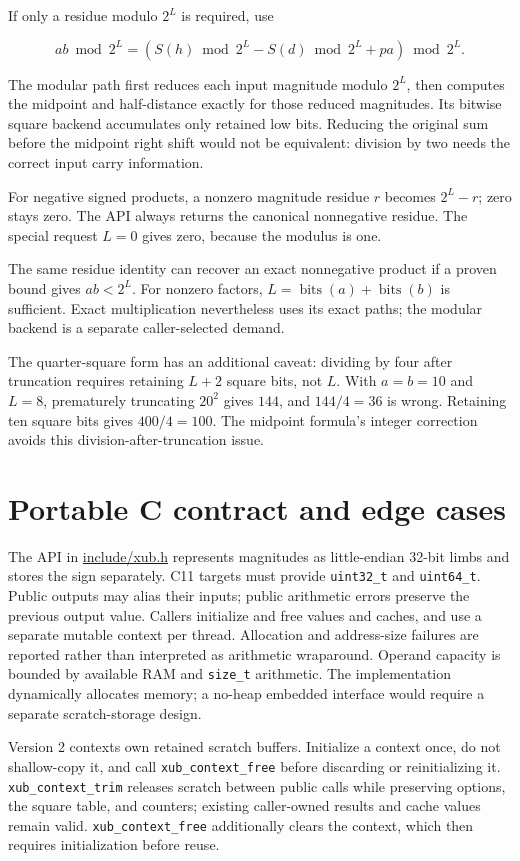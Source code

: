 \documentclass[11pt,a4paper]{article}
\begin{document}
If only a residue modulo $2^L$ is required, use

\[
ab\bmod2^L=(S(h)\bmod2^L-S(d)\bmod2^L+pa)\bmod2^L.
\]

The modular path first reduces each input magnitude modulo $2^L$, then computes the midpoint and half-distance exactly for those reduced magnitudes. Its bitwise square backend accumulates only retained low bits. Reducing the original sum before the midpoint right shift would not be equivalent: division by two needs the correct input carry information.

For negative signed products, a nonzero magnitude residue $r$ becomes $2^L-r$; zero stays zero. The API always returns the canonical nonnegative residue. The special request $L=0$ gives zero, because the modulus is one.

The same residue identity can recover an exact nonnegative product if a proven bound gives $ab<2^L$. For nonzero factors, $L=\operatorname{bits}(a)+\operatorname{bits}(b)$ is sufficient. Exact multiplication nevertheless uses its exact paths; the modular backend is a separate caller-selected demand.

The quarter-square form has an additional caveat: dividing by four after truncation requires retaining $L+2$ square bits, not $L$. With $a=b=10$ and $L=8$, prematurely truncating $20^2$ gives $144$, and $144/4=36$ is wrong. Retaining ten square bits gives $400/4=100$. The midpoint formula's integer correction avoids this division-after-truncation issue.

\section{Portable C contract and edge cases}

The API in \href{\detokenize{include/xub.h}}{include/xub.h} represents magnitudes as little-endian 32-bit limbs and stores the sign separately. C11 targets must provide \texttt{uint32\_t} and \texttt{uint64\_t}. Public outputs may alias their inputs; public arithmetic errors preserve the previous output value. Callers initialize and free values and caches, and use a separate mutable context per thread. Allocation and address-size failures are reported rather than interpreted as arithmetic wraparound. Operand capacity is bounded by available RAM and \texttt{size\_t} arithmetic. The implementation dynamically allocates memory; a no-heap embedded interface would require a separate scratch-storage design.

Version 2 contexts own retained scratch buffers. Initialize a context once, do not shallow-copy it, and call \texttt{xub\_context\_free} before discarding or reinitializing it. \texttt{xub\_context\_trim} releases scratch between public calls while preserving options, the square table, and counters; existing caller-owned results and cache values remain valid. \texttt{xub\_context\_free} additionally clears the context, which then requires initialization before reuse.
\end{document}
